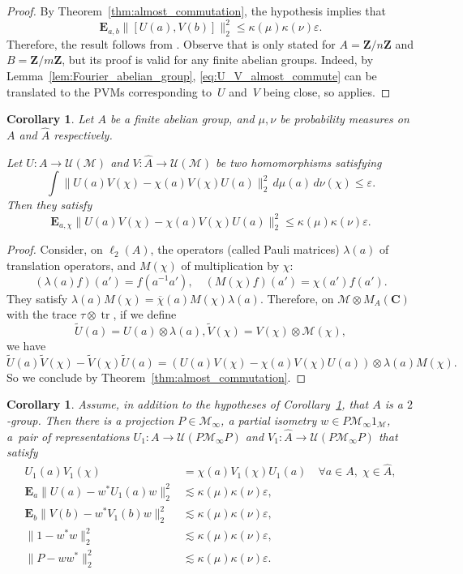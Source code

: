 \documentclass[10pt]{amsart}
\theoremstyle{plain}
\newtheorem{corollary}[theorem]{Corollary}
\theoremstyle{definition}
\newcommand{\C}{\mathbf{C}}
\newcommand{\Z}{\mathbf{Z}}
\newcommand{\cM}{\mathcal{M}}
\newcommand{\E}{\mathbf{E}}
\newcommand{\cU}{\mathcal{U}}
\DeclareMathOperator{\tr}{tr}
\begin{document}
\begin{proof} By Theorem~\ref{thm:almost_commutation}, the hypothesis implies that
\begin{equation}\label{eq:U_V_almost_commute} \E_{a,b} \| [U(a),V(b)]\|_2^2 \leq \kappa(\mu) \kappa(\nu) \varepsilon.
\end{equation}
Therefore, the result follows from \cite[Cor.\,5]{orthonormalisation}. Observe that \cite[Cor.\,5]{orthonormalisation} is only stated for $A=\Z/n\Z$ and $B=\Z/m\Z$, but its proof is valid for any finite abelian groups. Indeed, by Lemma~\ref{lem:Fourier_abelian_group}, \eqref{eq:U_V_almost_commute} can be translated to the PVMs corresponding to~$U$ and~$V$ being close, so \cite[Th.\,4]{orthonormalisation} applies.
\end{proof}
\begin{corollary}\label{thm:almost_anticommutation}
Let $A$ be a finite abelian group, and $\mu,\nu$ be probability measures on $A$ and $\hat A$ respectively.

Let $U:A \to \cU(\cM)$ and $V:\hat A \to \cU(\cM)$ be two homomorphisms satisfying
\[
\int \| U(a)V(\chi) -\chi(a) V(\chi) U(a) \|_2^2 \,d\mu(a) \,d\nu(\chi) \leq \varepsilon.
\]
Then they satisfy
\[
\E_{a,\chi} \| U(a)V(\chi) -\chi(a) V(\chi) U(a) \|_2^2 \leq \kappa(\mu)\kappa(\nu)\varepsilon.
\]
\end{corollary}
\begin{proof}
Consider, on $\ell_2(A)$, the operators (called Pauli matrices) $\lambda(a)$ of translation operators, and $M(\chi)$ of multiplication by $\chi$:
\[
(\lambda(a) f)(a') = f(a^{-1}a'),\quad (M(\chi) f)(a') = \chi(a') f(a').
\]
They satisfy $\lambda(a) M(\chi) = \overline{\chi}(a) M(\chi) \lambda(a)$.
Therefore, on $\cM \otimes M_A(\C)$ with the trace $\tau \otimes \tr$, if we define
\[
\tilde{U}(a) = U(a) \otimes \lambda(a), \tilde{V}(\chi) = V(\chi) \otimes \cM(\chi),
\]
we have
\[
\tilde U(a)\tilde V(\chi) -\tilde V(\chi) \tilde U(a) = (U(a)V(\chi) -\chi(a) V(\chi) U(a))\otimes \lambda(a) M(\chi).
\]
So we conclude by Theorem~\ref{thm:almost_commutation}.
\end{proof}

\begin{corollary}\label{thm:almost_anticommutation_2group}
Assume, in addition to the hypotheses of Corollary~\ref{thm:almost_anticommutation}, that $A$ is a $2$-group. Then there is a projection $P \in \cM_\infty$, a partial isometry $w \in P \cM_\infty 1_\cM$, a~pair of representations $U_1:A \to \cU(P\cM_\infty P)$ and $V_1:\hat A \to \cU(P\cM_\infty P)$ that satisfy
\begin{align*}
U_1(a) V_1(\chi) &= \chi(a) V_1(\chi) U_1(a)\quad\forall a \in A,\;\chi \in \hat A,
\\
\E_a \| U(a) - w^* U_1(a)w\|_2^2 &\lesssim \kappa(\mu)\kappa(\nu) \varepsilon,
\\
\E_b \| V(b) - w^* V_1(b)w\|_2^2 &\lesssim \kappa(\mu)\kappa(\nu) \varepsilon,
\\
\|1-w^*w\|_2^2 &\lesssim \kappa(\mu)\kappa(\nu) \varepsilon,
\\
\|P-ww^*\|_2^2 &\lesssim \kappa(\mu)\kappa(\nu) \varepsilon.
\end{align*}
\end{corollary}
\end{document}
